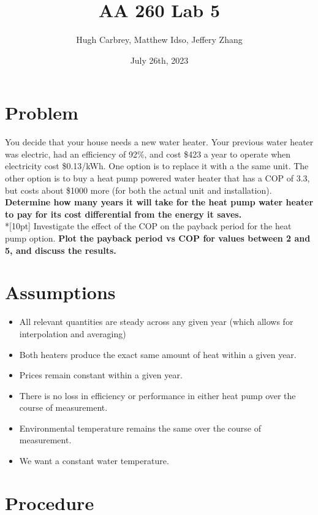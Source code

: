 \documentclass{article}
\title{\textbf{AA 260 Lab 5}}
\author{Hugh Carbrey, Matthew Idso, Jeffery Zhang}
\date{July 26th, 2023}
\begin{document}
\maketitle
\section{Problem}
You decide that your house needs a new water heater. Your previous water heater was electric,
had an efficiency of 92\%, and cost \$423 a year to operate when electricity cost \$0.13/kWh. One option is to replace it with a the same unit. The other option is to buy a heat pump powered
water heater that has a COP of 3.3, but costs about \$1000 more (for both the actual unit and
installation). \textbf{Determine how many years it will take for the heat pump water heater to pay for its cost differential from the energy it saves.} \\*[10pt]
Investigate the effect of the COP on the payback period for the heat pump option. \textbf{Plot the payback period vs COP for values between 2 and 5, and discuss the results.}

\section{Assumptions}
\begin{itemize}
    \item All relevant quantities are steady across any given year (which allows for interpolation and averaging)
    \item Both heaters produce the exact same amount of heat within a given year.
    \item Prices remain constant within a given year.
    \item There is no loss in efficiency or performance in either heat pump over the course of measurement.
    \item Environmental temperature remains the same over the course of measurement.
    \item We want a constant water temperature.
\end{itemize}
\section{Procedure}
\end{document}
